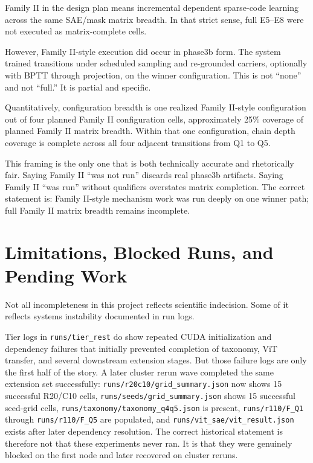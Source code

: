 \documentclass[11pt]{article}
\begin{document}
Family II in the design plan means incremental dependent sparse-code learning across the same SAE/mask matrix breadth. In that strict sense, full E5--E8 were not executed as matrix-complete cells.

However, Family II-style execution did occur in phase3b form. The system trained transitions under scheduled sampling and re-grounded carriers, optionally with BPTT through projection, on the winner configuration. This is not ``none'' and not ``full.'' It is partial and specific.

Quantitatively, configuration breadth is one realized Family II-style configuration out of four planned Family II configuration cells, approximately 25\% coverage of planned Family II matrix breadth. Within that one configuration, chain depth coverage is complete across all four adjacent transitions from Q1 to Q5.

This framing is the only one that is both technically accurate and rhetorically fair. Saying Family II ``was not run'' discards real phase3b artifacts. Saying Family II ``was run'' without qualifiers overstates matrix completion. The correct statement is: Family II-style mechanism work was run deeply on one winner path; full Family II matrix breadth remains incomplete.

\section{Limitations, Blocked Runs, and Pending Work}
Not all incompleteness in this project reflects scientific indecision. Some of it reflects systems instability documented in run logs.

Tier logs in \texttt{runs/tier\_rest} do show repeated CUDA initialization and dependency failures that initially prevented completion of taxonomy, ViT transfer, and several downstream extension stages. But those failure logs are only the first half of the story. A later cluster rerun wave completed the same extension set successfully: \texttt{runs/r20c10/grid\_summary.json} now shows 15 successful R20/C10 cells, \texttt{runs/seeds/grid\_summary.json} shows 15 successful seed-grid cells, \texttt{runs/taxonomy/taxonomy\_q4q5.json} is present, \texttt{runs/r110/F\_Q1} through \texttt{runs/r110/F\_Q5} are populated, and \texttt{runs/vit\_sae/vit\_result.json} exists after later dependency resolution. The correct historical statement is therefore not that these experiments never ran. It is that they were genuinely blocked on the first node and later recovered on cluster reruns.
\end{document}

